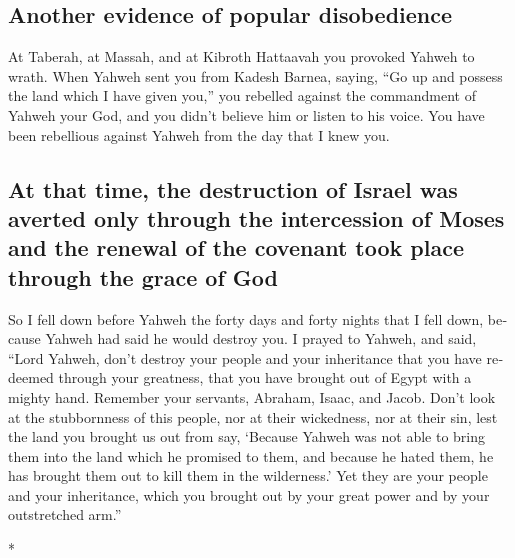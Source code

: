 \begin{paracol}{2}
\begin{otherlanguage}{english}
\hypertarget{another-evidence-of-popular-disobedience}{%
\subsection{Another evidence of popular
disobedience}\label{another-evidence-of-popular-disobedience}}

 At Taberah, at Massah, and at Kibroth Hattaavah you
provoked Yahweh to wrath.  When Yahweh sent you from
Kadesh Barnea, saying, ``Go up and possess the land which I have given
you,'' you rebelled against the commandment of Yahweh your God, and you
didn't believe him or listen to his voice.  You have been
rebellious against Yahweh from the day that I knew you.

\hypertarget{at-that-time-the-destruction-of-israel-was-averted-only-through-the-intercession-of-moses-and-the-renewal-of-the-covenant-took-place-through-the-grace-of-god}{%
\subsection{At that time, the destruction of Israel was averted only
through the intercession of Moses and the renewal of the covenant took
place through the grace of
God}\label{at-that-time-the-destruction-of-israel-was-averted-only-through-the-intercession-of-moses-and-the-renewal-of-the-covenant-took-place-through-the-grace-of-god}}

 So I fell down before Yahweh the forty days and forty
nights that I fell down, because Yahweh had said he would destroy you.
 I prayed to Yahweh, and said, ``Lord Yahweh, don't
destroy your people and your inheritance that you have redeemed through
your greatness, that you have brought out of Egypt with a mighty hand.
 Remember your servants, Abraham, Isaac, and Jacob. Don't
look at the stubbornness of this people, nor at their wickedness, nor at
their sin,  lest the land you brought us out from say,
`Because Yahweh was not able to bring them into the land which he
promised to them, and because he hated them, he has brought them out to
kill them in the wilderness.'  Yet they are your people
and your inheritance, which you brought out by your great power and by
your outstretched arm.''

\end{otherlanguage}

\switchcolumn[0]*

\hypertarget{section-18}{%
}
\end{paracol}
